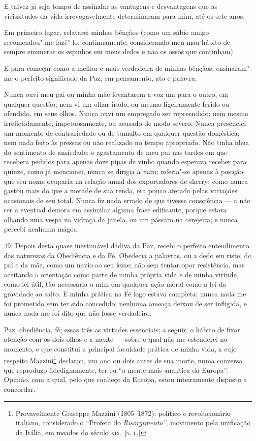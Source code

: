 E talvez já seja tempo de assinalar as vantagens e desvantagens que as
vicissitudes da vida irrevogavelmente determinaram para mim, até os sete
anos.

Em primeiro lugar, relatarei minhas bênçãos (como um sábio amigo
recomendou"-me fazê"-lo, continuamente; considerando meu mau hábito de
sempre enumerar os espinhos em meus dedos e não os ossos que continham).

E para começar como a melhor e mais verdadeira de minhas bênçãos,
ensinaram"-me o perfeito significado da Paz, em pensamento, ato e
palavra.

Nunca ouvi meu pai ou minha mãe levantarem a voz um para o outro, em
qualquer questão; nem vi um olhar irado, ou mesmo ligeiramente ferido ou
ofendido, em seus olhos. Nunca ouvi um empregado ser repreendido; nem
mesmo irrefletidamente, impetuosamente, ou acusado de modo severo. Nunca
presenciei um momento de contrariedade ou de tumulto em qualquer questão
doméstica; nem nada feito às pressas ou não realizado no tempo
apropriado. Não tinha ideia do sentimento de ansiedade; o agastamento de
meu pai nas tardes em que recebera pedidos para apenas doze pipas de
vinho quando esperava receber para quinze, como já mencionei, nunca se
dirigia a \emph{mim}; referia"-se apenas à posição que seu nome ocuparia
na relação anual dos exportadores de sherry; como nunca gastou mais do
que a metade de sua renda, era pouco afetado pelas variações ocasionais
de seu total. Nunca fiz nada errado de que tivesse consciência --- a não
ser a eventual demora em assimilar alguma frase edificante, porque
estava olhando uma vespa na vidraça da janela, ou um pássaro na
cerejeira; e nunca percebi nenhuma mágoa.

49. Depois desta quase inestimável dádiva da Paz, recebi o perfeito
entendimento das naturezas da Obediência e da Fé. Obedecia a palavras,
ou a dedo em riste, do pai e da mãe, como um navio ao seu leme; não sem
tentar opor resistência, mas aceitando a orientação como parte de minha
própria vida e de minha virtude, como lei útil, tão necessária a mim em
qualquer ação moral como a lei da gravidade ao salto. E minha prática na
Fé logo estava completa: nunca nada me foi prometido sem ter sido
concedido; nenhuma ameaça deixou de ser infligida, e nunca nada me foi
dito que não fosse verdadeiro.

Paz, obediência, fé; essas três as virtudes essenciais; a seguir, o
hábito de fixar atenção com os dois olhos e a mente --- sobre o qual não
me estenderei no momento, e que constitui a principal faculdade prática
de minha vida, a cujo respeito Mazzini\footnote{Provavelmente Giuseppe
  Mazzini (1805--1872): político e revolucionário italiano,
  considerado o ``Profeta do \emph{Risorgimento''}, movimento pela
  unificação da Itália, em meados do século \textsc{xix}. {[}\textsc{n.\,t.}{]}} declarou,
um ano ou dois antes de sua morte, numa conversa que reproduzo
fidedignamente, ter eu ``a mente mais analítica da Europa''. Opinião,
com a qual, pelo que conheço da Europa, estou inteiramente disposto a
concordar.

